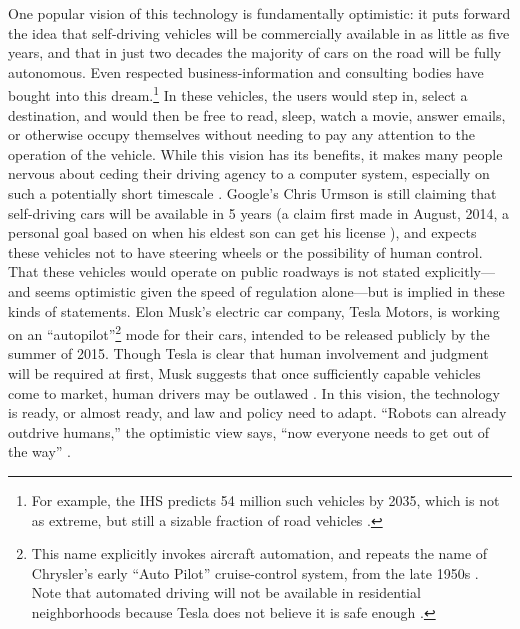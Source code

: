 
One popular vision of this technology is fundamentally optimistic: it
puts forward the
idea that self-driving vehicles will be commercially available in as little
as five years, and that in just two decades the majority of cars on the road will be
fully autonomous. Even respected business-information and consulting
bodies have bought into this dream.\footnote{For example, the IHS
  predicts 54 million such vehicles by 2035, which is not as extreme,
  but still a sizable fraction of road vehicles \cite{IHSstudy}.} In
these vehicles, the users would 
step in, select a destination, and would then be free to read, sleep,
watch a movie, answer emails, or otherwise occupy themselves without
needing to pay any attention to the operation of the vehicle. While this
vision has its benefits, it makes many people nervous about
ceding their driving agency to a computer system, especially on such a
potentially short timescale \cite{clytton}. Google's Chris Urmson is
still claiming that self-driving cars will be available in 5 years (a
claim first made in August, 2014, a personal goal based on when his
eldest son can get his license \cite{gomesObstacles}), and expects
these vehicles not to have steering wheels or the possibility of human
control. That these vehicles would operate on public roadways is not
stated explicitly---and seems optimistic given the speed of regulation
alone---but is implied in these kinds of statements. Elon Musk's
electric car company, Tesla Motors, is working on an 
``autopilot''\footnote{This name explicitly invokes aircraft
  automation, and repeats the name of Chrysler's early ``Auto Pilot''
cruise-control system, from the late 1950s
\cite{kesslerElon}. Note that automated driving will not be available
in residential neighborhoods because Tesla does not believe it is safe
enough \cite{slashgearDaviesT}.} mode for their cars, intended to be released publicly by
the summer of 2015.
Though Tesla is clear that human involvement and judgment will be
required at first, Musk suggests 
that once sufficiently capable vehicles 
come to market, human drivers may be
outlawed \cite{kingGoogle}.
In this vision, the technology is ready, or almost ready, and law and policy need to
adapt. ``Robots can already outdrive humans,'' the optimistic view says, ``now
everyone needs to get out of the way''
\cite{fisherInside}.



